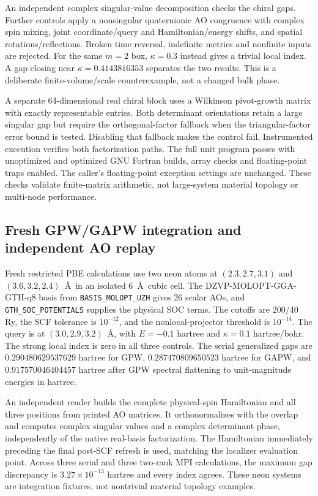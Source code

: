 \documentclass[11pt]{article}
\begin{document}
An independent complex singular-value decomposition checks the
chiral gaps. Further controls apply a nonsingular quaternionic
AO congruence with complex spin mixing, joint coordinate/query
and Hamiltonian/energy shifts, and spatial rotations/reflections.
Broken time reversal, indefinite metrics and nonfinite inputs
are rejected. For the same $m=2$ box, $\kappa=0.3$ instead
gives a trivial local index. A gap closing near
$\kappa=0.4143816353$ separates the two results.
This is a deliberate finite-volume/scale counterexample, not
a changed bulk phase.

A separate 64-dimensional real chiral block uses a Wilkinson
pivot-growth matrix with exactly representable entries. Both
determinant orientations retain a large singular gap but require
the orthogonal-factor fallback when the triangular-factor error
bound is tested. Disabling that fallback makes the control fail.
Instrumented execution verifies both factorization paths.
The full unit program passes with unoptimized and optimized
GNU Fortran builds, array checks and floating-point traps enabled.
The caller's floating-point exception settings are unchanged.
These checks validate finite-matrix arithmetic, not large-system
material topology or multi-node performance.

\subsection{Fresh GPW/GAPW integration and independent AO replay}
Fresh restricted PBE calculations use two neon atoms at
$(2.3,2.7,3.1)$ and $(3.6,3.2,2.4)$~\AA\ in an isolated
6~\AA\ cubic cell. The DZVP-MOLOPT-GGA-GTH-q8 basis from
\texttt{BASIS\_MOLOPT\_UZH} gives 26 scalar AOs, and
\texttt{GTH\_SOC\_POTENTIALS} supplies the physical SOC terms.
The cutoffs are 200/40 Ry, the SCF tolerance is $10^{-12}$,
and the nonlocal-projector threshold is $10^{-14}$.
The query is at $(3.0,2.9,3.2)$~\AA, with
$E=-0.1$ hartree and $\kappa=0.1$ hartree/bohr.
The strong local index is zero in all three controls.
The serial generalized gaps are $0.290480629537629$ hartree
for GPW, $0.287470809650523$ hartree for GAPW, and
$0.917570046404457$ hartree after GPW spectral flattening
to unit-magnitude energies in hartree.

An independent reader builds the complete physical-spin Hamiltonian
and all three positions from printed AO matrices. It orthonormalizes
with the overlap and computes complex singular values and a
complex determinant phase, independently of the native real-basis
factorization. The Hamiltonian immediately preceding the final
post-SCF refresh is used, matching the localizer evaluation point.
Across three serial and three two-rank MPI calculations, the maximum
gap discrepancy is $3.27\times10^{-13}$ hartree and every index agrees.
These neon systems are integration fixtures, not nontrivial material
topology examples.
\end{document}
